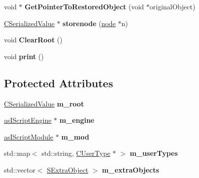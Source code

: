 \begin{DoxyCompactItemize}
\item 
\mbox{\label{class_c_serializer_af34a154a3afece327db8ae346ba2aa0f}} 
void $\ast$ {\bfseries Get\+Pointer\+To\+Restored\+Object} (void $\ast$original\+Object)
\item 
\mbox{\label{class_c_serializer_add6d96e8a3e6c5539c0cd2862176209f}} 
\hyperlink{class_c_serialized_value}{C\+Serialized\+Value} $\ast$ {\bfseries storenode} (\hyperlink{structnode}{node} $\ast$n)
\item 
\mbox{\label{class_c_serializer_a611f269d936c8e8b3479d82e3c0a2282}} 
void {\bfseries Clear\+Root} ()
\item 
\mbox{\label{class_c_serializer_aa1fefef38b7001901a6a60849a14b5a3}} 
void {\bfseries print} ()
\end{DoxyCompactItemize}
\subsection*{Protected Attributes}
\begin{DoxyCompactItemize}
\item 
\mbox{\label{class_c_serializer_a81ba3be165acfbfe8aa950c5c02d5a5d}} 
\hyperlink{class_c_serialized_value}{C\+Serialized\+Value} {\bfseries m\+\_\+root}
\item 
\mbox{\label{class_c_serializer_ae89342ebfec2abb602c71775dde0246a}} 
\hyperlink{classas_i_script_engine}{as\+I\+Script\+Engine} $\ast$ {\bfseries m\+\_\+engine}
\item 
\mbox{\label{class_c_serializer_a9807204d9a6c7ad778bcae60904ee0f5}} 
\hyperlink{classas_i_script_module}{as\+I\+Script\+Module} $\ast$ {\bfseries m\+\_\+mod}
\item 
\mbox{\label{class_c_serializer_af46461faa7d8a506dc8d4eeb5e993ba5}} 
std\+::map$<$ std\+::string, \hyperlink{struct_c_user_type}{C\+User\+Type} $\ast$ $>$ {\bfseries m\+\_\+user\+Types}
\item 
\mbox{\label{class_c_serializer_a3e747b0912879a320e14dba06bed1a84}} 
std\+::vector$<$ \hyperlink{struct_c_serializer_1_1_s_extra_object}{S\+Extra\+Object} $>$ {\bfseries m\+\_\+extra\+Objects}
\end{DoxyCompactItemize}
